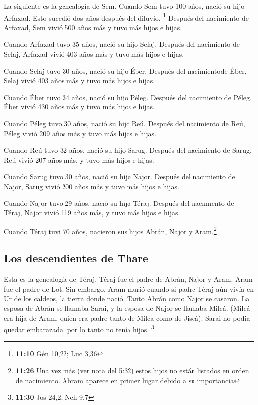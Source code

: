  La siguiente es la genealogía de Sem. Cuando Sem tuvo
100 años, nació su hijo Arfaxad. Esto sucedió dos años después del
diluvio. \footnote{\textbf{11:10} Gén 10,22; Luc 3,36} 
Después del nacimiento de Arfaxad, Sem vivió 500 años más y tuvo más
hijos e hijas.

 Cuando Arfaxad tuvo 35 años, nació su hijo Selaj.
 Después del nacimiento de Selaj, Arfaxad vivió 403 años
más y tuvo más hijos e hijas.

 Cuando Selaj tuvo 30 años, nació su hijo Éber.
 Después del nacimientode Éber, Selaj vivió 403 años más
y tuvo más hijos e hijas.

 Cuando Éber tuvo 34 años, nació su hijo Péleg.
 Después del nacimiento de Péleg, Éber vivió 430 años más
y tuvo más hijos e hijas.

 Cuando Péleg tuvo 30 años, nació su hijo Reú.
 Después del nacimiento de Reú, Péleg vivió 209 años más
y tuvo más hijos e hijas.

 Cuando Reú tuvo 32 años, nació su hijo Sarug.
 Después del nacimiento de Sarug, Reú vivió 207 años más,
y tuvo más hijos e hijas.

 Cuando Sarug tuvo 30 años, nació su hijo Najor.
 Después del nacimiento de Najor, Sarug vivió 200 años
más y tuvo más hijos e hijas.

 Cuando Najor tuvo 29 años, nació su hijo Téraj.
 Después del nacimiento de Téraj, Najor vivió 119 años
más, y tuvo más hijos e hijas.

 Cuando Téraj tuvi 70 años, nacieron sus hijos Abrán,
Najor y Aram.\footnote{\textbf{11:26} Una vez más (ver nota del 5:32)
  estos hijos no están listados en orden de nacimiento. Abram aparece en
  primer lugar debido a su importancia}

\hypertarget{los-descendientes-de-thare}{%
\subsection{Los descendientes de
Thare}\label{los-descendientes-de-thare}}

 Esta es la genealogía de Téraj. Téraj fue el padre de
Abrán, Najor y Aram. Aram fue el padre de Lot.  Sin
embargo, Aram murió cuando si padre Téraj aún vivía en Ur de los
caldeos, la tierra donde nació.  Tanto Abrán como Najor
se casaron. La esposa de Abrán se llamaba Sarai, y la esposa de Najor se
llamaba Milcá. (Milcá era hija de Aram, quien era padre tanto de Milca
como de Jiscá).  Sarai no podia quedar embarazada, por lo
tanto no tenía hijos. \footnote{\textbf{11:30} Jos 24,2; Neh 9,7}

